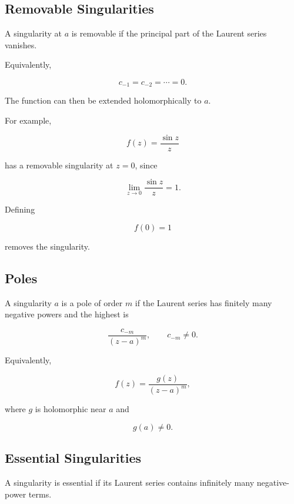 \subsection{Removable Singularities}
\label{subsec:removable-singularities}

A singularity at \(a\) is removable if the principal part of the Laurent
series vanishes.

Equivalently,

\[
\boxed{
c_{-1}=c_{-2}=\cdots=0.
}
\]

The function can then be extended holomorphically to \(a\).

For example,

\[
f(z)
=
\frac{\sin z}{z}
\]

has a removable singularity at \(z=0\), since

\[
\lim_{z\to0}\frac{\sin z}{z}=1.
\]

Defining

\[
f(0)=1
\]

removes the singularity.

\subsection{Poles}
\label{subsec:complex-poles}

A singularity \(a\) is a pole of order \(m\) if the Laurent series has
finitely many negative powers and the highest is

\[
\frac{c_{-m}}{(z-a)^m},
\qquad
c_{-m}\neq0.
\]

Equivalently,

\[
\boxed{
f(z)
=
\frac{g(z)}
{(z-a)^m},
}
\]

where \(g\) is holomorphic near \(a\) and

\[
g(a)\neq0.
\]

\subsection{Essential Singularities}
\label{subsec:essential-singularities}

A singularity is essential if its Laurent series contains infinitely many
negative-power terms.

